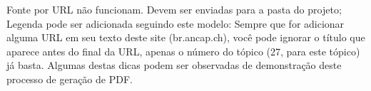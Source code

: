 {}\markdownRendererUlBeginTight
\markdownRendererUlItem Fonte por URL não funcionam. Devem ser enviadas para a pasta do projeto;\markdownRendererUlItemEnd 
\markdownRendererUlItem Legenda pode ser adicionada seguindo este modelo:\markdownRendererUlItemEnd 
\markdownRendererUlEndTight \markdownRendererUlItemEnd 
\markdownRendererUlEnd \markdownRendererInterblockSeparator
{}\markdownRendererInterblockSeparator
{}\markdownRendererUlBeginTight
\markdownRendererUlItem Sempre que for adicionar alguma URL em seu texto deste site (br.ancap.ch), você pode ignorar o título que aparece antes do final da URL, apenas o número do tópico (27, para este tópico) já basta.\markdownRendererUlItemEnd 
\markdownRendererUlEndTight \markdownRendererInterblockSeparator
{}Algumas destas dicas podem ser observadas  de demonstração deste processo de geração de PDF.\relax